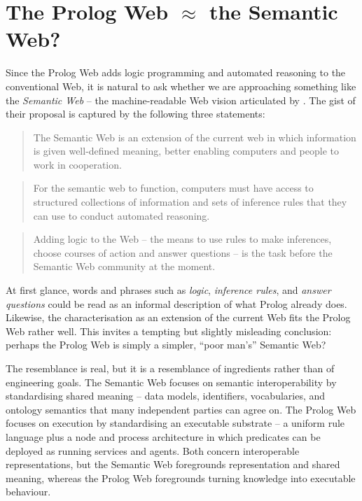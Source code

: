 \chapter{The Prolog Web $\approx$ the Semantic Web?}\label{sec:wp-ws-sw}

Since the Prolog Web adds logic programming and automated reasoning to the conventional Web, it is natural to ask whether we are approaching something like the \emph{Semantic Web} -- the machine-readable Web vision articulated by  \citep{bernerslee2001semantic}. The gist of their proposal is captured by the following three statements:

\begin{quotation}
The Semantic Web is an extension of the current web in which information is given well-defined meaning, better enabling computers and people to work in cooperation.
\end{quotation}

\begin{quotation}
For the semantic web to function, computers must have access to structured collections of information and sets of inference rules that they can use to conduct automated reasoning.
\end{quotation}

\begin{quotation}
Adding logic to the Web -- the means to use rules to make inferences, choose courses of action and answer questions -- is the task before the Semantic Web community at the moment.
\end{quotation}

\noindent At first glance, words and phrases such as \emph{logic}, \emph{inference rules}, and \emph{answer questions} could be read as an informal description of what Prolog already does. Likewise, the characterisation as an extension of the current Web fits the Prolog Web rather well. This invites a tempting but slightly misleading conclusion: perhaps the Prolog Web is simply a simpler, ``poor man's'' Semantic Web?

The resemblance is real, but it is a resemblance of ingredients rather than of engineering goals. The Semantic Web focuses on semantic interoperability by standardising shared meaning -- data models, identifiers, vocabularies, and ontology semantics that many independent parties can agree on. The Prolog Web focuses on execution by standardising an executable substrate -- a uniform rule language plus a node and process architecture in which predicates can be deployed as running services and agents. Both concern interoperable representations, but the Semantic Web foregrounds representation and shared meaning, whereas the Prolog Web foregrounds turning knowledge into executable behaviour.

